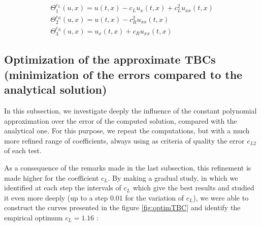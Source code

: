 \begin{equation*}
    \begin{gathered}
        \Theta_1^{c_L}(u,x) = u(t,x) - c_L u_x(t,x)  + c_L^2  u_{xx}(t,x) \\
        \Theta_2^{c_R}(u,x) =  u(t,x) - c_R^2    u_{xx}(t,x)\\
        \Theta_3^{c_R} (u,x)= u_x(t,x) + c_R u_{xx}(t,x) 
    \end{gathered}
\end{equation*}

\subsection{Optimization of the approximate TBCs (minimization of the errors compared to the analytical solution)}

\indent In this subsection, we investigate deeply the influence of the constant polynomial approximation over the error of the computed solution, compared with the analytical one. For this purpose, we repeat the computations, but with a much more refined range of coefficients, always using as criteria of quality the error $e_{L2}$ of each test.

\indent As a consequence of the remarks made in the last subsection, this refinement is made higher for the coefficient $c_L$. By making a gradual study, in which we identified at each step the intervals of $c_L$ which give the best results and studied it even more deeply (up to a step $0.01$ for the variation of $c_L$), we were able to construct the curves presented in the figure \ref{fig:optimTBC} and identify the empirical optimum $c_L = 1.16$ :

